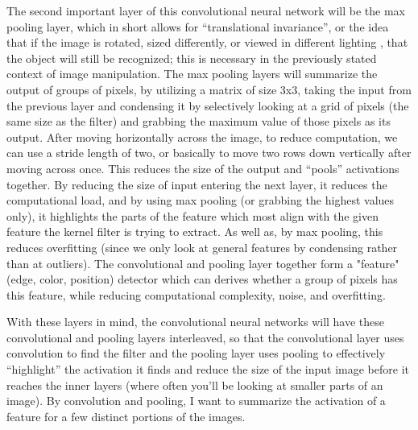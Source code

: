 \documentclass[10pt,twocolumn]{article}
\begin{document}

The second important layer of this convolutional neural network will be the max pooling layer, which in short allows for “translational invariance”, or the idea that if the image is rotated, sized differently, or viewed in different lighting \cite{Khandelwal2018}, that the object will still be recognized; this is necessary in the previously stated context of image manipulation. The max pooling layers will summarize the output of groups of pixels, by utilizing a matrix of size 3x3, taking the input from the previous layer and condensing it by selectively looking at a grid of pixels (the same size as the filter) and grabbing the maximum value of those pixels as its output. After moving horizontally across the image, to reduce computation, we can use a stride length of two, or basically to move two rows down vertically after moving across once. This reduces the size of the output and “pools” activations together. By reducing the size of input entering the next layer, it reduces the computational load, and by using max pooling (or grabbing the highest values only), it highlights the parts of the feature which most align with the given feature the kernel filter is trying to extract. As well as, by max pooling, this reduces overfitting (since we only look at general features by condensing rather than at outliers). The convolutional and pooling layer together form a "feature" (edge, color, position) detector which can derives whether a group of pixels has this feature, while reducing computational complexity, noise, and overfitting. 



With these layers in mind, the convolutional neural networks will have these convolutional and pooling layers interleaved, so that the convolutional layer uses convolution to find the filter and the pooling layer uses pooling to effectively “highlight” the activation it finds and reduce the size of the input image before it reaches the inner layers (where often you’ll be looking at smaller parts of an image). By convolution and pooling, I want to summarize the activation of a feature for a few distinct portions of the images.
\end{document}
